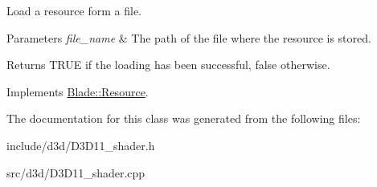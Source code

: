 Load a resource form a file. 


\begin{DoxyParams}{Parameters}
{\em file\+\_\+name} & The path of the file where the resource is stored. \\
\hline
\end{DoxyParams}
\begin{DoxyReturn}{Returns}
T\+R\+UE if the loading has been successful, false otherwise. 
\end{DoxyReturn}


Implements \hyperlink{class_blade_1_1_resource_ad89ab00a3b81df1338a8310ec92c5cff}{Blade\+::\+Resource}.



The documentation for this class was generated from the following files\+:\begin{DoxyCompactItemize}
\item 
include/d3d/D3\+D11\+\_\+shader.\+h\item 
src/d3d/D3\+D11\+\_\+shader.\+cpp\end{DoxyCompactItemize}
